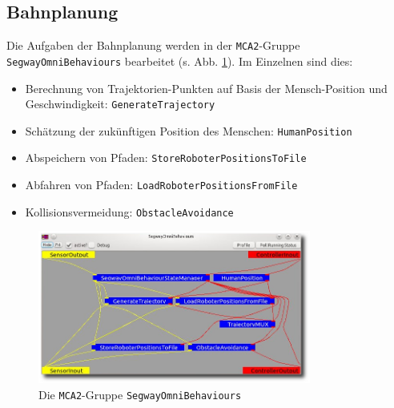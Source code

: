 \subsection{Bahnplanung}
\label{bahnplanung_subsec}
\authorsection{\editortobias}



Die Aufgaben der Bahnplanung werden in der \lstinline{MCA2}-Gruppe \lstinline{SegwayOmniBehaviours} bearbeitet (s. Abb. \ref{fig:behaviours}).
Im Einzelnen sind dies:
\begin{itemize}
	\item Berechnung von Trajektorien-Punkten auf Basis der Mensch-Position und Geschwindigkeit: \lstinline{GenerateTrajectory}
	\item Schätzung der zukünftigen Position des Menschen: \lstinline{HumanPosition}
	\item Abspeichern von Pfaden: \lstinline{StoreRoboterPositionsToFile}
	\item Abfahren von Pfaden: \lstinline{LoadRoboterPositionsFromFile}
	\item Kollisionsvermeidung: \lstinline{ObstacleAvoidance}
\end{itemize}

\begin{figure}[h]
	\center
	\includegraphics[width=0.8\textwidth]{graphics/behaviours}
	\caption{Die \lstinline{MCA2}-Gruppe \lstinline{SegwayOmniBehaviours}}
	\label{fig:behaviours}
\end{figure}

